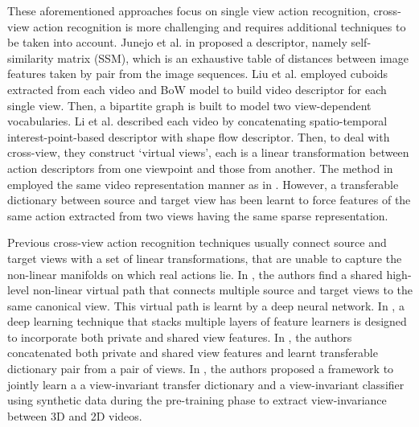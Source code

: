         These aforementioned approaches focus on single view action recognition, cross-view action recognition is more challenging and requires additional techniques to be taken into account. 
        Junejo et al. in \cite{junejo2008cross} proposed a descriptor, namely self-similarity matrix (SSM), which is an exhaustive table of distances between image features taken by pair from the image sequences.
        Liu et al. \cite{liu2011cross} employed cuboids extracted from each video and BoW model to build video descriptor for each single view. Then, a bipartite graph is built to model two view-dependent vocabularies.
        Li et al. \cite{li2012discriminative} described each video by concatenating spatio-temporal interest-point-based descriptor with shape flow descriptor. Then, to deal with cross-view, they construct ‘virtual views’, each is a linear transformation between action descriptors from one viewpoint and those from another.
        The method in \cite{zheng2012cross, zheng2013learning} employed the same video representation manner as in \cite{li2012discriminative}.
        However, a transferable dictionary between source and target view has been learnt to force features of the same action extracted from two views having the same sparse representation. 

        Previous cross-view action recognition techniques usually connect source and target views with a set of linear transformations, that are unable to capture the non-linear manifolds on which real actions lie. In \cite{rahmani2017learning}, the authors find a shared high-level non-linear virtual path that connects multiple source and target views to the same canonical view. This virtual path is learnt by a deep neural network. In \cite{kong2017deeply}, a deep learning technique that stacks multiple layers of feature learners is designed to incorporate both private and shared view features. 
        In \cite{liu2018hierarchically}, the authors concatenated both private and shared view features and learnt transferable dictionary pair from a pair of views. In \cite{zhang2018action}, the authors proposed a framework to jointly learn a a view-invariant transfer dictionary and a view-invariant classifier using synthetic data during the pre-training phase to extract view-invariance between 3D and 2D videos.

